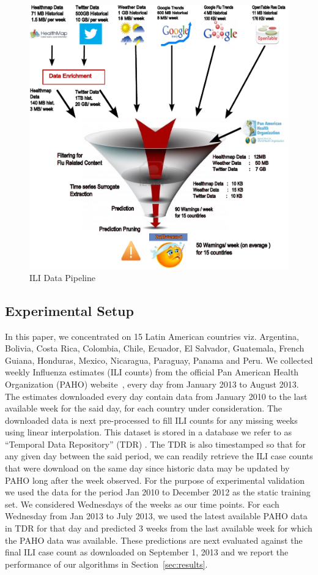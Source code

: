 \begin{figure} \centering
    \includegraphics[scale=0.3]{fig/ili_data_pipeline.pdf}
    \caption{\label{fig:ili_data_pipeline} ILI Data Pipeline}
 \end{figure}

\subsection{Experimental Setup}
 In this paper, we concentrated on 15 Latin
American countries viz. Argentina, Bolivia, Costa Rica, Colombia, Chile,
Ecuador,  El Salvador, Guatemala, French Guiana, Honduras, Mexico, Nicaragua,
Paraguay, Panama and Peru. We collected weekly Influenza estimates (ILI counts)
from the official Pan American Health Organization (PAHO)
website~\cite{PAHO:2013}, every day from January 2013 to August 2013. The
estimates downloaded every day contain data from January 2010 to the last
available week for the said day, for each country under consideration. The
downloaded data is next pre-processed to fill ILI counts for any missing weeks
using linear interpolation. This dataset is stored in a database we refer to as
``Temporal Data Repository'' (TDR) .  The TDR is also timestamped so that for
any given day between the said period, we can readily retrieve the ILI case
counts that were download on the same day since historic data may be updated by
PAHO long after the week observed.  For the purpose of experimental validation
we used the data for the period Jan 2010 to December 2012 as the static
training set. We considered Wednesdays of the weeks as our time points.  For
each Wednesday from Jan 2013 to July 2013, we used the latest available PAHO
data in TDR for that day and predicted 3 weeks from the last available week for
which the PAHO data was available. These predictions are next evaluated against
the final ILI case count as downloaded on September 1, 2013 and we report the
performance of our algorithms in Section~\ref{sec:results}. 

